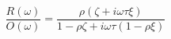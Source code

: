 \documentclass{article}
\begin{document}
\fontsize{22}{29}\selectfont
\[
\frac{R(\omega)}{O(\omega)}=\frac{\rho(\zeta+i\omega\tau\xi)}{1-\rho\zeta+i\omega\tau(1-\rho\xi)}
\]
\end{document}
